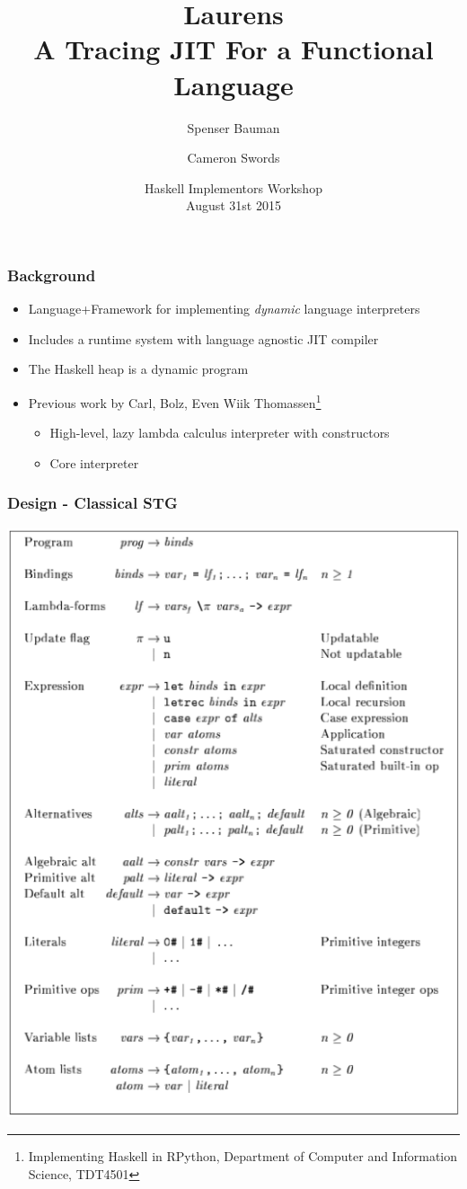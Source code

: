 \documentclass[xetex,serif,mathserif]{beamer}
\title{Laurens \\ {\normalsize A Tracing JIT For a Functional Language} }
\author[shortname]{Spenser Bauman \and Cameron Swords}
\institute[shortinst]{
    Indiana University Bloomington, USA
}
\date{Haskell Implementors Workshop \\ August 31st 2015}
\newenvironment{slide}[1]{\begin{frame}\frametitle{#1}}{\end{frame}}
\begin{document}
\frame{\titlepage}

\begin{slide}{Background}
  \begin{itemize}
    \item Language+Framework for implementing \emph{dynamic} language interpreters
    \item Includes a runtime system with language agnostic JIT compiler
    \item The Haskell heap is a dynamic program
    \item Previous work by Carl, Bolz, 
          Even Wiik Thomassen\footnote{Implementing Haskell in RPython, Department of Computer
    and Information Science, TDT4501}
      \begin{itemize}
        \item High-level, lazy lambda calculus interpreter with constructors
        \item Core interpreter
      \end{itemize}
  \end{itemize}
\end{slide}

\begin{slide}{Design - Classical STG}
  \begin{center}
  \includegraphics[scale=0.3]{stg-def}
  \end{center}
\end{slide}
\end{document}
